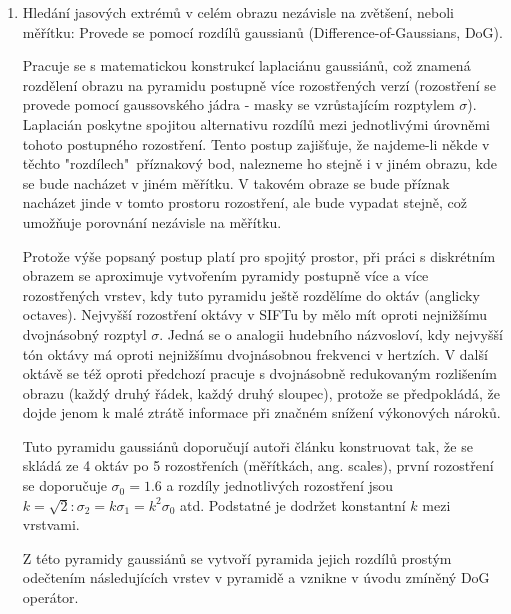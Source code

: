 	\begin{enumerate}
		\item Hledání jasových extrémů v celém obrazu nezávisle na zvětšení, neboli měřítku: Provede se pomocí rozdílů gaussianů (Difference-of-Gaussians, DoG).
			
			Pracuje se s matematickou konstrukcí laplaciánu gaussiánů, což znamená rozdělení obrazu na pyramidu postupně více rozostřených verzí (rozostření se provede pomocí gaussovského jádra - masky se vzrůstajícím rozptylem $\sigma{}$). Laplacián poskytne spojitou alternativu rozdílů mezi jednotlivými úrovněmi tohoto postupného rozostření. Tento postup zajišťuje, že najdeme-li někde v těchto "rozdílech"\ příznakový bod, nalezneme ho stejně i v jiném obrazu, kde se bude nacházet v jiném měřítku. V takovém obraze se bude příznak nacházet jinde v tomto prostoru rozostření, ale bude vypadat stejně, což umožňuje porovnání nezávisle na měřítku.
			
			Protože výše popsaný postup platí pro spojitý prostor, při práci s diskrétním obrazem se aproximuje vytvořením pyramidy postupně více a více rozostřených vrstev, kdy tuto pyramidu ještě rozdělíme do oktáv (anglicky octaves). Nejvyšší rozostření oktávy v SIFTu by mělo mít oproti nejnižšímu dvojnásobný rozptyl $\sigma$. Jedná se o analogii hudebního názvosloví, kdy nejvyšší tón oktávy má oproti nejnižšímu dvojnásobnou frekvenci v hertzích. V další oktávě se též oproti předchozí pracuje s dvojnásobně redukovaným rozlišením obrazu (každý druhý řádek, každý druhý sloupec), protože se předpokládá, že dojde jenom k malé ztrátě informace při značném snížení výkonových nároků.
			
			Tuto pyramidu gaussiánů doporučují autoři článku \cite{lowe2004distinctive} konstruovat tak, že se skládá ze 4 oktáv po 5 rozostřeních (měřítkách, ang. scales), první rozostření se doporučuje $\sigma_0 = 1.6$ a rozdíly jednotlivých rozostření jsou $k=\sqrt{2}: \sigma_2 = k \sigma_1 = k^2 \sigma_0$ atd. Podstatné je dodržet konstantní $k$ mezi vrstvami.
			
			Z této pyramidy gaussiánů se vytvoří pyramida jejich rozdílů prostým odečtením následujících vrstev v pyramidě a vznikne v úvodu zmíněný DoG operátor.		
			

\end{enumerate}
